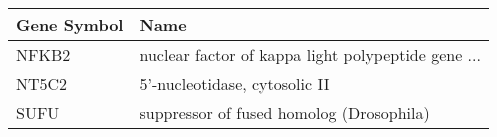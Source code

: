 \begin{tabular}{ll}
\toprule
Gene Symbol &                                               Name \\
\midrule
      NFKB2 & nuclear factor of kappa light polypeptide gene ... \\
      NT5C2 &                      5'-nucleotidase, cytosolic II \\
       SUFU &           suppressor of fused homolog (Drosophila) \\
\bottomrule
\end{tabular}
